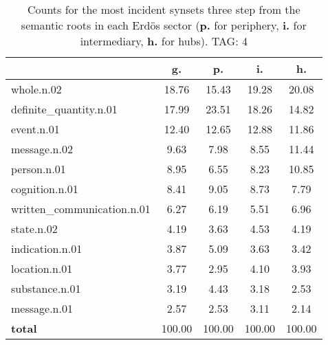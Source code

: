 \begin{table}[h!]
\begin{center}
\begin{tabular}{| l | c | c | c | c |}\hline
 & g. & p. & i. & h. \\\hline
whole.n.02 & 18.76  & 15.43  & 19.28  & 20.08 \\\hline
definite\_quantity.n.01 & 17.99  & 23.51  & 18.26  & 14.82 \\\hline
event.n.01 & 12.40  & 12.65  & 12.88  & 11.86 \\\hline
message.n.02 & 9.63  & 7.98  & 8.55  & 11.44 \\\hline
person.n.01 & 8.95  & 6.55  & 8.23  & 10.85 \\\hline
cognition.n.01 & 8.41  & 9.05  & 8.73  & 7.79 \\\hline
written\_communication.n.01 & 6.27  & 6.19  & 5.51  & 6.96 \\\hline
state.n.02 & 4.19  & 3.63  & 4.53  & 4.19 \\\hline
indication.n.01 & 3.87  & 5.09  & 3.63  & 3.42 \\\hline
location.n.01 & 3.77  & 2.95  & 4.10  & 3.93 \\\hline
substance.n.01 & 3.19  & 4.43  & 3.18  & 2.53 \\\hline
message.n.01 & 2.57  & 2.53  & 3.11  & 2.14 \\\hline
{{\bf total}} & 100.00  & 100.00  & 100.00  & 100.00 \\\hline
\end{tabular}
\caption{Counts for the most incident synsets three step from the semantic roots in each Erd\"os sector ({\bf p.} for periphery, {\bf i.} for intermediary, {\bf h.} for hubs). TAG: 4}
\end{center}
\end{table}